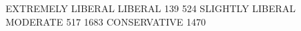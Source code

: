 \begin{Schunk}
\begin{Soutput}
EXTREMELY LIBERAL           LIBERAL 
              139               524 
 SLIGHTLY LIBERAL          MODERATE 
              517              1683 
     CONSERVATIVE 
             1470 
\end{Soutput}
\end{Schunk}
